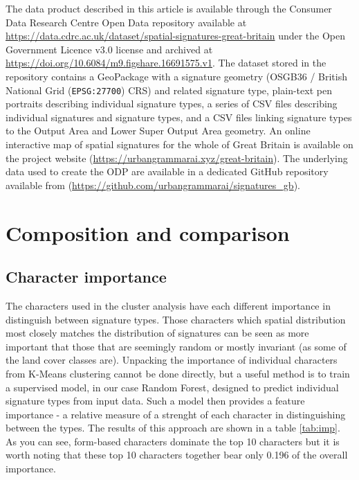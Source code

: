 \documentclass[fleqn,10pt]{wlscirep}
\begin{document}
The data product described in this article is available through the Consumer Data
Research Centre Open Data repository available at
\hyperlink{https://data.cdrc.ac.uk/dataset/spatial-signatures-great-britain}{https://data.cdrc.ac.uk/dataset/spatial-signatures-great-britain}
under the Open Government Licence v3.0 license and archived at
\hyperlink{https://doi.org/10.6084/m9.figshare.16691575.v1}{https://doi.org/10.6084/m9.figshare.16691575.v1}.
The dataset stored in the repository contains a GeoPackage with a signature geometry
(OSGB36 / British National Grid (\texttt{EPSG:27700}) CRS) and related signature type,
plain-text pen portraits describing individual signature types, a series of CSV files
describing individual signatures and signature types, and a CSV files linking signature
types to the Output Area and Lower Super Output Area geometry. An online interactive map
of spatial signatures for the whole of Great Britain is available on the project website
(\hyperlink{https://urbangrammarai.xyz/great-britain}{https://urbangrammarai.xyz/great-britain}).
The underlying data used to create the ODP are available in a dedicated GitHub repository
available from (\hyperlink{https://github.com/urbangrammarai/signatures\_gb}{https://github.com/urbangrammarai/signatures\_gb}).


\section*{Composition and comparison}


\subsection*{Character importance}

The characters used in the cluster analysis have each different importance in distinguish between signature types.
Those characters which spatial distribution most closely matches the distribution of signatures
can be seen as more important that those that are seemingly random or mostly invariant (as some of the land cover classes are).
Unpacking the importance of individual characters from K-Means clustering cannot be done directly, but
a useful method is to train a supervised model, in our case Random Forest, designed to predict individual
signature types from input data. Such a model then provides a feature importance - a relative measure of
a strenght of each character in distinguishing between the types. The results of this approach are shown in
a table \ref{tab:imp}. As you can see, form-based characters dominate the top 10 characters but it is worth
noting that these top 10 characters together bear only 0.196 of the overall importance.
\end{document}
